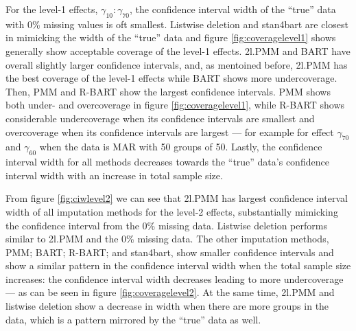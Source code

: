 \documentclass[preprint,12pt]{elsarticle}
\begin{document}

For the level-1 effects, $\gamma_{10}:\gamma_{70}$, the confidence interval width of the ``true'' data with 0\% missing values is oft smallest. Listwise deletion and stan4bart are closest in mimicking the width of the ``true'' data and figure \ref{fig:coveragelevel1} shows generally show acceptable coverage of the level-1 effects. 2l.PMM and BART have overall slightly larger confidence intervals, and, as mentoined before, 2l.PMM has the best coverage of the level-1 effects while BART shows more undercoverage. Then, PMM and R-BART show the largest confidence intervals. PMM shows both under- and overcoverage in figure \ref{fig:coveragelevel1}, while R-BART shows considerable undercoverage when its confidence intervals are smallest and overcoverage when its confidence intervals are largest --- for example for effect $\gamma_{70}$ and $\gamma_{60}$ when the data is MAR with 50 groups of 50. Lastly, the confidence interval width for all methods decreases towards the ``true'' data's confidence interval width with an increase in total sample size. 


From figure \ref{fig:ciwlevel2} we can see that 2l.PMM has largest confidence interval width of all imputation methods for the level-2 effects, substantially mimicking the confidence interval from the 0\% missing data. Listwise deletion performs similar to 2l.PMM and the 0\% missing data. The other imputation methods, PMM; BART; R-BART; and stan4bart, show smaller confidence intervals and show a similar pattern in the confidence interval width when the total sample size increases: the confidence interval width decreases leading to more undercoverage --- as can be seen in figure \ref{fig:coveragelevel2}. At the same time, 2l.PMM and listwise deletion show a decrease in width when there are more groups in the data, which is a pattern mirrored by the ``true'' data as well. 

\end{document}
